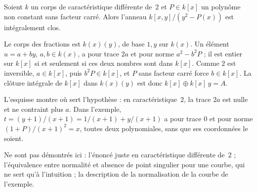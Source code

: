 \begin{encadre}
\begin{theoreme*}
Soient $k$ un corps de caractéristique différente de~$2$ et $P \in k[x]$ un polynôme non constant sans facteur carré. Alors l'anneau $k[x, y]/(y^2 - P(x))$ est intégralement clos.
\end{theoreme*}
\end{encadre}

\begin{demopage}
Le corps des fractions est $k(x)(y)$, de base $1, y$ sur $k(x)$. Un élément $u = a + by$, $a, b \in k(x)$, a pour trace $2a$ et pour norme $a^2 - b^2 P$ ; il est entier sur $k[x]$ si et seulement si ces deux nombres sont dans $k[x]$. Comme $2$ est inversible, $a \in k[x]$, puis $b^2 P \in k[x]$, et $P$ sans facteur carré force $b \in k[x]$. La clôture intégrale de $k[x]$ dans $k(x)(y)$ est donc $k[x] \oplus k[x]\,y = A$.
\end{demopage}

\noindent L'esquisse montre où sert l'hypothèse : en caractéristique~$2$, la trace $2a$ est nulle et ne contraint plus $a$. Dans l'exemple, $t = (y + 1)/(x + 1) = 1/(x+1) + y/(x+1)$ a pour trace $0$ et pour norme $(1 + P)/(x + 1)^2 = x$, toutes deux polynomiales, sans que ses coordonnées le soient.

Ne sont pas démontrés ici : l'énoncé juste en caractéristique différente de~$2$ ; l'équivalence entre normalité et absence de point singulier pour une courbe, qui ne sert qu'à l'intuition ; la description de la normalisation de la courbe de l'exemple.

